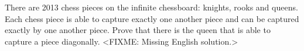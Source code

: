 \problem
There are 2013 chess pieces on the infinite chessboard: knights, rooks and
queens.
Each chess piece is able to capture exactly one another piece and can be
captured exactly by one another piece.
Prove that there is the queen that is able to capture a piece diagonally.
\solution
<FIXME: Missing English solution.>
\endproblem
